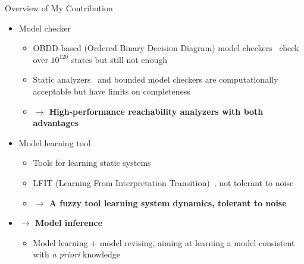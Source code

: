 \documentclass[8pt]{beamer}
\newcommand{\highlight}[1]{\textcolor{blue!50}{\textbf{#1}}}
\begin{document}
\begin{frame}{Overview of My Contribution}
\begin{itemize}
    \item<+-> Model checker
    \begin{itemize}
        \item<+-> OBDD-based (Ordered Binary Decision Diagram) model checkers~\cite{brayton1996vis,cimatti2000nusmv} check over $10^{120}$ states but still not enough
        \item<+-> Static analyzers~\cite{pauleve2012} and bounded model checkers are computationally acceptable but have limits on completeness
        \item<+-> \highlight{$\to$ High-performance reachability analyzers with both advantages}
    \end{itemize}
    \item<+-> Model learning tool
    \begin{itemize}
        \item<+-> Tools for learning static systems~\cite{mochida2018statistical}
        \item<+-> LFIT (Learning From Interpretation Transition)~\cite{ribeiro2018learning}, not tolerant to noise
        \item<+-> \highlight{$\to$ A fuzzy tool learning system dynamics, tolerant to noise}  
    \end{itemize}
    \item<+-> \highlight{$\to$ Model inference}
    \begin{itemize}
        \item<+-> Model learning + model revising, aiming at learning a model consistent with \textit{a priori} knowledge
    \end{itemize}
\end{itemize}
\end{frame}
\end{document}

